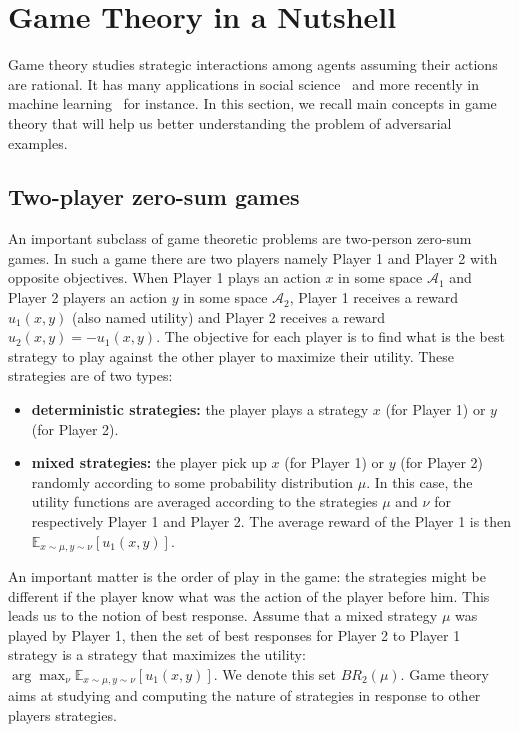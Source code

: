 \section{Game Theory in a Nutshell}

Game theory studies strategic interactions among agents assuming their actions are rational. It has many applications in social science~\citep{xxx} and more recently in machine learning~\citep{goodfellow2014generative} for instance. In this section, we recall main concepts in game theory that will help us better understanding the problem of adversarial examples. 


\subsection{Two-player zero-sum games}

An important subclass of game theoretic problems are two-person zero-sum games.  In such a game there are two players namely Player 1 and Player 2 with opposite objectives. When Player 1 plays an action $x$ in some space $\mathcal{A}_1$ and Player 2 players an action $y$ in some space $\mathcal{A}_2$, Player 1 receives a reward $u_1(x,y)$ (also named utility) and Player 2 receives a reward $u_2(x,y)= -u_1(x,y)$. The objective for each player is to find what is the best strategy to play against the other player to maximize their utility. These strategies are of two types:
\begin{itemize}
    \item \textbf{deterministic strategies:} the player plays a strategy $x$ (for Player 1) or $y$ (for Player 2). 
    \item \textbf{mixed strategies:} the player pick up $x$ (for Player 1) or $y$ (for Player 2) randomly according to some probability distribution $\mu$. In this case, the utility functions are averaged according to the strategies $\mu$ and $\nu$ for respectively Player 1 and Player 2.  The average reward of the Player 1 is then $\mathbb{E}_{x\sim\mu,y\sim\nu}\left[u_1(x,y)\right]$.
\end{itemize}

An important matter is the order of play in the game: the strategies might be different if the player know what was the action of the player before him. This leads us to the notion of best response. Assume that a mixed strategy $\mu$ was played by Player 1, then the set of best responses for Player 2 to Player 1 strategy is a strategy that maximizes the utility: $\arg\max_{\nu}\mathbb{E}_{x\sim\mu,y\sim\nu}\left[u_1(x,y)\right]$. We denote this set $BR_2(\mu)$. Game theory aims at studying and computing the nature of strategies in response to other players strategies.

